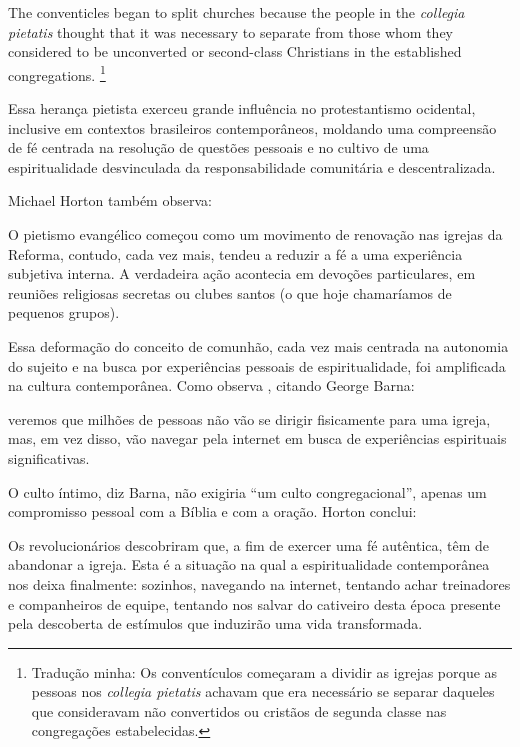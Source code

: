 \begin{citacao}
    The conventicles began to split churches because the people in the \textit{collegia pietatis} thought that it was necessary to separate from those whom they considered to be unconverted or second-class Christians in the established congregations. \cite[p.~4]{brenner_pietism}\footnote{Tradução minha: Os conventículos começaram a dividir as igrejas porque as pessoas nos \textit{collegia pietatis} achavam que era necessário se separar daqueles que consideravam não convertidos ou cristãos de segunda classe nas congregações estabelecidas.}
\end{citacao}

Essa herança pietista exerceu grande influência no protestantismo ocidental, inclusive em contextos brasileiros contemporâneos, moldando uma compreensão de fé centrada na resolução de questões pessoais e no cultivo de uma espiritualidade desvinculada da responsabilidade comunitária e descentralizada.

Michael Horton também observa:

\begin{citacao}
    O pietismo evangélico começou como um movimento de renovação nas igrejas da Reforma, contudo, cada vez mais, tendeu a reduzir a fé a uma experiência subjetiva interna. A verdadeira ação acontecia em devoções particulares, em reuniões religiosas secretas ou clubes santos (o que hoje chamaríamos de pequenos grupos). \cite[p.~178]{horton2010}
\end{citacao}

Essa deformação do conceito de comunhão, cada vez mais centrada na autonomia do sujeito e na busca por experiências pessoais de espiritualidade, foi amplificada na cultura contemporânea. Como observa , citando George Barna:

\begin{citacao}
    veremos que milhões de pessoas não vão se dirigir fisicamente para uma igreja, mas, em vez disso, vão navegar pela internet em busca de experiências espirituais significativas. 
\end{citacao}

O culto íntimo, diz Barna, não exigiria ``um culto congregacional'', apenas um compromisso pessoal com a Bíblia e com a oração. Horton conclui:

\begin{citacao}
    Os revolucionários descobriram que, a fim de exercer uma fé autêntica, têm de abandonar a igreja. Esta é a situação na qual a espiritualidade contemporânea nos deixa finalmente: sozinhos, navegando na internet, tentando achar treinadores e companheiros de equipe, tentando nos salvar do cativeiro desta época presente pela descoberta de estímulos que induzirão uma vida transformada. \cite[p.~164]{horton2010}
\end{citacao}

